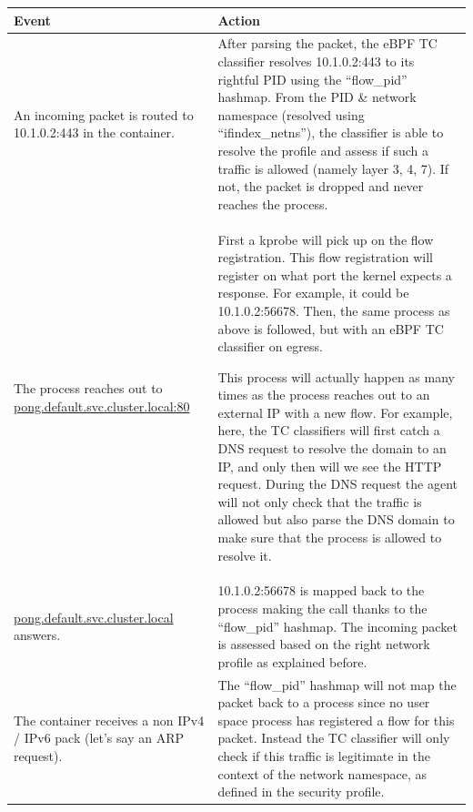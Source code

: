 \begin{table}
  \setlength{\tabcolsep}{5pt}
  \def\arraystretch{1.5}
  \begin{tabular}{|p{}|p{}|}
    \hline \centering Event & \centering Action \tabularnewline

    \hline An incoming packet is routed to 10.1.0.2:443 in the container. & After parsing the packet, the eBPF TC classifier resolves 10.1.0.2:443 to its rightful PID using the “flow\_pid” hashmap. From the PID \& network namespace (resolved using “ifindex\_netns”), the classifier is able to resolve the profile and assess if such a traffic is allowed (namely layer 3, 4, 7). If not, the packet is dropped and never reaches the process. \\

    \hline The process reaches out to \url{pong.default.svc.cluster.local:80} & First a kprobe will pick up on the flow registration. This flow registration will register on what port the kernel expects a response. For example, it could be 10.1.0.2:56678. Then, the same process as above is followed, but with an eBPF TC classifier on egress.

    This process will actually happen as many times as the process reaches out to an external IP with a new flow. For example, here, the TC classifiers will first catch a DNS request to resolve the domain to an IP, and only then will we see the HTTP request. During the DNS request the agent will not only check that the traffic is allowed but also parse the DNS domain to make sure that the process is allowed to resolve it. \\

    \hline \url{pong.default.svc.cluster.local} answers. & 10.1.0.2:56678 is mapped back to the process making the call thanks to the “flow\_pid” hashmap. The incoming packet is assessed based on the right network profile as explained before. \\

    \hline The container receives a non IPv4 / IPv6 pack (let’s say an ARP request). & The “flow\_pid” hashmap will not map the packet back to a process since no user space process has registered a flow for this packet. Instead the TC classifier will only check if this traffic is legitimate in the context of the network namespace, as defined in the security profile. \\

    \hline
  \end{tabular}
\end{table}

